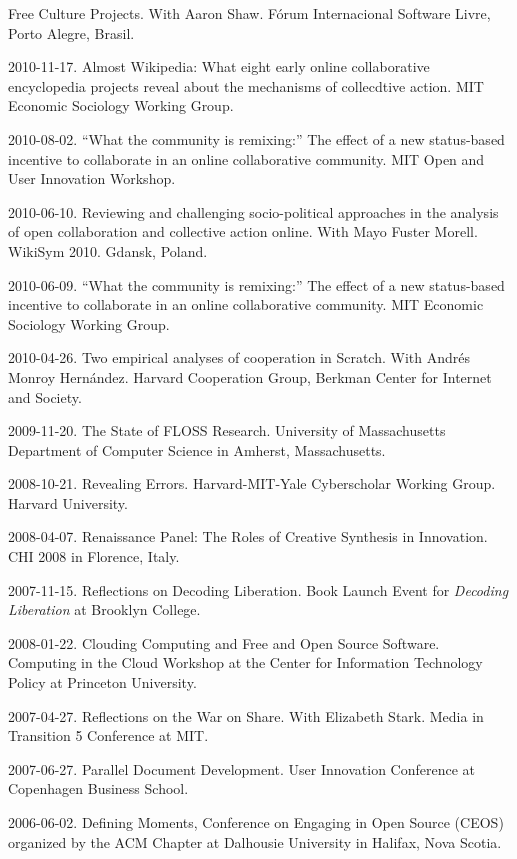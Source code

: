 \documentclass[11pt]{article}
\newenvironment{cvlist}{
\begin{list}{}{\leftmargin=3.0em \itemindent=-3.0em}
  \setlength{\itemsep}{0pt}
  \setlength{\parskip}{0em}
  \setlength{\parsep}{1em}
  \setlength{\parindent}{0em}}
{\vspace{1em}
\end{list}}
\begin{document}
\begin{cvlist}
  Free Culture Projects.  With Aaron Shaw. Fórum Internacional
  Software Livre, Porto Alegre, Brasil.
\item 2010-11-17. Almost Wikipedia: What eight early online
  collaborative encyclopedia projects reveal about the mechanisms of
  collecdtive action. MIT Economic Sociology Working Group. %
\item 2010-08-02. ``What the community is remixing:'' The effect of a
  new status-based incentive to collaborate in an online collaborative
  community. MIT Open and User Innovation Workshop.
\item 2010-06-10. Reviewing and challenging socio-political
  approaches in the analysis of open collaboration and collective
  action online. With Mayo Fuster Morell. WikiSym 2010. Gdansk,
  Poland.
\item 2010-06-09. ``What the community is remixing:'' The effect of a
  new status-based incentive to collaborate in an online collaborative
  community. MIT Economic Sociology Working Group. %
\item 2010-04-26. Two empirical analyses of cooperation in
  Scratch. With Andrés Monroy Hernández. Harvard Cooperation Group,
  Berkman Center for Internet and Society.
\item 2009-11-20. The State of FLOSS Research. University of
  Massachusetts Department of Computer Science in Amherst,
  Massachusetts.
\item 2008-10-21. Revealing Errors. Harvard-MIT-Yale Cyberscholar
  Working Group. Harvard University.
\item 2008-04-07. Renaissance Panel: The Roles of Creative Synthesis
  in Innovation. CHI 2008 in Florence, Italy.
\item 2007-11-15. Reflections on Decoding Liberation. Book Launch
  Event for \emph{Decoding Liberation} at Brooklyn College. %
\item 2008-01-22. Clouding Computing and Free and Open Source
  Software. Computing in the Cloud Workshop at the Center for
  Information Technology Policy at Princeton University.
\item 2007-04-27. Reflections on the War on Share. With Elizabeth
  Stark. Media in Transition 5 Conference at MIT.
\item 2007-06-27. Parallel Document Development. User Innovation
  Conference at Copenhagen Business School.
\item 2006-06-02. Defining Moments, Conference on Engaging in Open
  Source (CEOS) organized by the ACM Chapter at Dalhousie University
  in Halifax, Nova Scotia. %

\end{cvlist}
\end{document}
